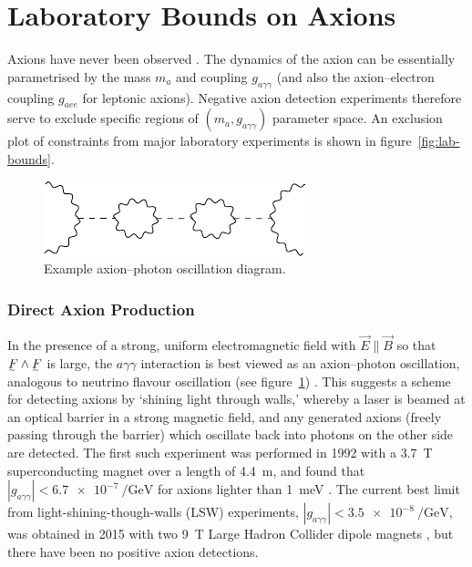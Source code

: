 \section{Laboratory Bounds on Axions}

Axions have never been observed \cite[§\,91]{ParticleDataGroup-review-2020}.
The dynamics of the axion can be essentially parametrised by the mass $m_a$ and coupling $g_{aγγ}$ (and also the axion--electron coupling $g_{aee}$ for leptonic axions).
Negative axion detection experiments therefore serve to exclude specific regions of $(m_a, g_{aγγ})$ parameter space.
An exclusion plot of constraints from major laboratory experiments is shown in figure~\ref{fig:lab-bounds}.

\begin{figure}
	\centering
	\includegraphics{diagrams/axion-photon-oscillation.pdf}
	\caption{Example axion--photon oscillation diagram.}
	\label{fig:axion-photon-oscillation}
\end{figure}


\subsubsection{Direct Axion Production}
In the presence of a strong, uniform electromagnetic field with $\vec E \parallel \vec B$ so that $\ts F\wedge\ts F$ is large, the $aγγ$ interaction is best viewed as an axion--photon oscillation, analogous to neutrino flavour oscillation (see figure~\ref{fig:axion-photon-oscillation}) \cite[§\,91.3.1]{ParticleDataGroup-review-2020}.
This suggests a scheme for detecting axions by `shining light through walls,' whereby a laser is beamed at an optical barrier in a strong magnetic field, and any generated axions (freely passing through the barrier) which oscillate back into photons on the other side are detected.
The first such experiment was performed in 1992 with a \SI{3.7}{\tesla} superconducting magnet over a length of \SI{4.4}{\meter}, and found that $|g_{aγγ}| < \SI{6.7e-7}{\per\giga\eV}$ for axions lighter than \SI{1}{\milli\eV} \cite{first-LSW-experiment}.
The current best limit from light-shining-though-walls (LSW) experiments, $|g_{aγγ}| < \SI{3.5e-8}{\per\giga\eV}$, was obtained in 2015 with two \SI{9}{\tesla} Large Hadron Collider dipole magnets \cite{best-LSW-experiment}, but there have been no positive axion detections.

